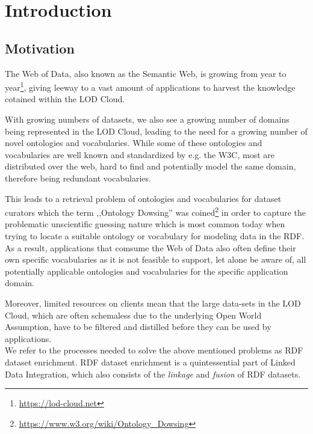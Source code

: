 \chapter{Introduction}
\label{ch:intro}
\section{Motivation}
\label{sec:motivation}
The Web of Data, also known as the Semantic Web, is growing from year to year\footnote{\url{https://lod-cloud.net}},
  giving leeway to a vast amount of applications to harvest the knowledge cotained within the \ac{LOD} Cloud.
  
With growing numbers of datasets, we also see a growing number of domains being represented in the \ac{LOD} Cloud, leading to the need for a growing number of novel ontologies and vocabularies.
While some of these ontologies and vocabularies are well known and standardized by e.g. the \ac{W3C}, most are distributed over the web, hard to find and potentially model the same domain, therefore being redundant vocabularies.

This leads to a retrieval problem of ontologies and vocabularies for dataset curators which the term ,,Ontology Dowsing'' was coined\footnote{\url{https://www.w3.org/wiki/Ontology_Dowsing}} in order to capture the problematic unscientific guessing nature which is most common today when trying to locate a suitable ontology or vocabulary for modeling data in the \ac{RDF}.
As a result, applications that comsume the Web of Data also often define their own specific vocabularies as it is not feasible to support, let alone be aware of, all potentially applicable ontologies and vocabularies for the specific application domain.

Moreover, limited resources on clients mean that the large data-sets in the \ac{LOD} Cloud, which are often schemaless due to the underlying Open World Assumption, have to be filtered and distilled before they can be used by applications.\\

We refer to the processes needed to solve the above mentioned problems as \ac{RDF} dataset enrichment.
\ac{RDF} dataset enrichment is a quintessential part of Linked Data Integration, which also consists of the \emph{linkage} and \emph{fusion} of \ac{RDF} datasets.

